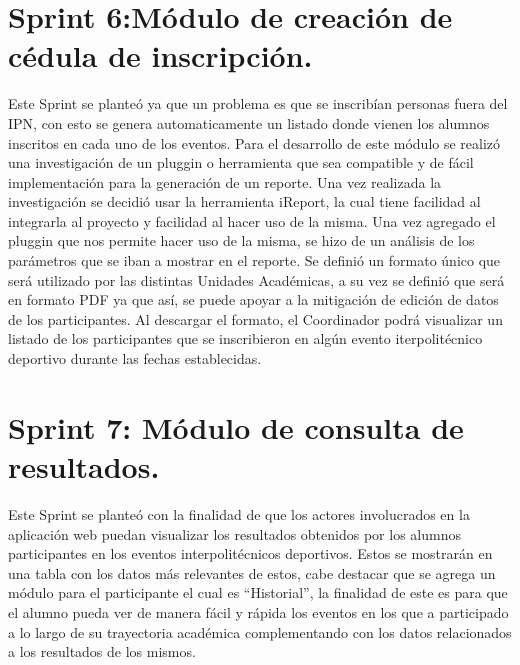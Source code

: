 	\section{Sprint 6:Módulo de creación de cédula de inscripción.}
	\noindent Este Sprint se planteó ya que un problema es que se inscribían personas fuera del IPN, con esto se genera automaticamente un listado donde vienen los alumnos inscritos en cada uno de los eventos.
	Para el desarrollo de este módulo se realizó una investigación de un pluggin o herramienta que sea compatible y de fácil implementación para la generación de un reporte. Una vez realizada la investigación se decidió usar la herramienta iReport, la cual tiene facilidad al integrarla al proyecto y facilidad al hacer uso de la misma. Una vez agregado el pluggin que nos permite hacer uso de la misma, se hizo de un análisis de los parámetros que se iban a mostrar en el reporte. Se definió un formato único que será utilizado por las distintas Unidades Académicas, a su vez se definió que será en formato PDF ya que así, se puede apoyar a la mitigación de edición de datos de los participantes. Al descargar el formato, el Coordinador podrá visualizar un listado de los participantes que se inscribieron en algún evento iterpolitécnico deportivo durante las fechas establecidas.
 
	
	\section{Sprint 7: Módulo de consulta de resultados.}
	\noindent Este Sprint se planteó con la finalidad de que los actores involucrados en la aplicación web puedan visualizar los resultados obtenidos por los alumnos participantes en los eventos interpolitécnicos deportivos. 
	Estos se mostrarán en una tabla con los datos más relevantes de estos, cabe destacar que se agrega un módulo para el participante el cual es “Historial”, la finalidad de este es para que el alumno pueda ver de manera fácil y rápida los eventos en los que a participado a lo largo de su trayectoria académica complementando con los datos relacionados a los resultados de los mismos. 
	
